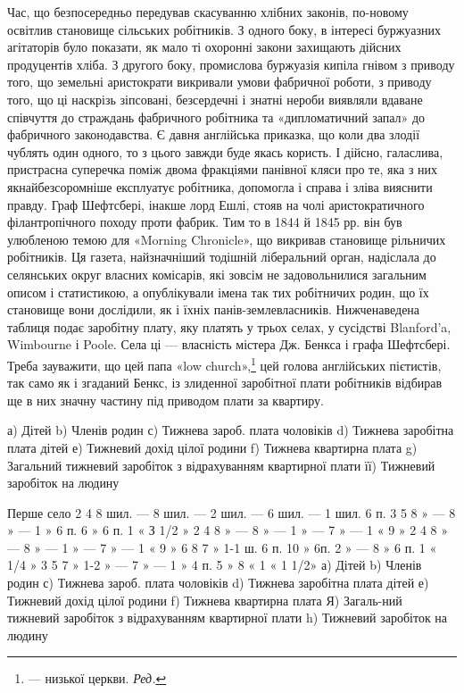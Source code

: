 Час, що безпосередньо передував скасуванню хлібних законів,
по-новому освітлив становище сільських робітників. З одного
боку, в інтересі буржуазних агітаторів було показати, як
мало ті охоронні закони захищають дійсних продуцентів хліба.
З другого боку, промислова буржуазія кипіла гнівом з приводу
того, що земельні аристократи викривали умови фабричної роботи,
з приводу того, що ці наскрізь зіпсовані, безсердечні і
знатні нероби виявляли вдаване співчуття до страждань фабричного
робітника та «дипломатичний запал» до фабричного законодавства.
Є давня англійська приказка, що коли два злодії
чублять один одного, то з цього завжди буде якась користь.
І дійсно, галаслива, пристрасна суперечка поміж двома фракціями
панівної кляси про те, яка з них якнайбезсоромніше експлуатує
робітника, допомогла і справа і зліва вияснити правду. Граф
Шефтсбері, інакше лорд Ешлі, стояв на чолі аристократичного
філантропічного походу проти фабрик. Тим то в 1844 й
1845 рр. він був улюбленою темою для «Morning Chronicle», що
викривав становище рільничих робітників. Ця газета, найзначніший
тодішній ліберальний орган, надіслала до селянських округ
власних комісарів, які зовсім не задовольнилися загальним
описом і статистикою, а опублікували імена так тих робітничих
родин, що їх становище вони дослідили, як і їхніх панів-землевласників.
Нижченаведена таблиця подає заробітну плату,
яку платять у трьох селах, у сусідстві Blanford’a, Wimbourne
і Poole. Села ці — власність містера Дж. Бенкса і графа Шефтсбері.
Треба зауважити, що цей папа «low church»,\footnote*{
— низької церкви. \emph{Ред.}
} цей голова англійських
пієтистів, так само як і згаданий Бенкс, із злиденної
заробітної плати робітників відбирав ще в них значну частину
під приводом плати за квартиру.

а) Дітей    b) Членів родин    с) Тижнева зароб. плата чоловіків    d) Тижнева заробітна плата дітей
   е) Тижневий дохід цілої родини    f) Тижнева квартирна плата
g) Загальний тижневий заробіток з відрахуванням квартирної плати    її) Тижневий заробіток на людину

Перше село
2    4    8 шил. —                8 шил. —     2 шил. —       6 шил.   —     1 шил. 6      п.
3    5    8    »     —                 8   »      —     1    »      6 п.   6    »       6 п.  1   «
    З 1/2 »
2    4    8    »     —                 8   »      —     1    »      —      7    »       —      1   «
     9       »
2    4    8    »     —                 8   »      —     1    »      —      7    »       —      1   «
     9       »
6    8    7    »    1-1 ш. 6 п.  10 »      6п.   2    »     —       8    »       6 п.   1  «
1/4 »
3    5    7    »    1-2  » —       7   »      —     1    »      4 п.   5    »       8 «     1  «
 1 1/2»
а) Дітей  b) Членів родин    с) Тижнева зароб. плата чоловіків    d) Тижнева заробітна плата дітей
 е) Тижневий дохід цілої родини    f) Тижнева квартирна плата    Я) Загаль-ний тижневий заробіток з
відрахуванням квартирної плати    h) Тижневий заробіток на людину

